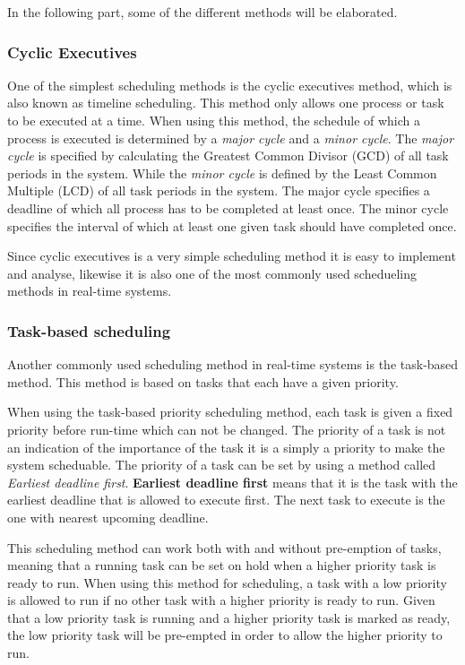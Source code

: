 In the following part, some of the different methods will be elaborated. 

\subsubsection{Cyclic Executives}
One of the simplest scheduling methods is the cyclic executives method, which is also known as timeline scheduling.
This method only allows one process or task to be executed at a time. 
When using this method, the schedule of which a process is executed is determined by a \textit{major cycle} and a \textit{minor cycle}.
The \textit{major cycle} is specified by calculating the Greatest Common Divisor (GCD) of all task periods in the system.
While the \textit{minor cycle} is defined by the Least Common Multiple (LCD) of all task periods in the system. 
The major cycle specifies a deadline of which all process has to be completed at least once.
The minor cycle specifies the interval of which at least one given task should have completed once. 

Since cyclic executives is a very simple scheduling method it is easy to implement and analyse, likewise it is also one of the most commonly used schedueling methods in real-time systems\cite{RealTimeEmbeddedSystems}. 

\subsubsection{Task-based scheduling}
Another commonly used scheduling method in real-time systems is the task-based method. 
This method is based on tasks that each have a given priority.

When using the task-based priority scheduling method, each task is given a fixed priority before run-time which can not be changed.
The priority of a task is not an indication of the importance of the task it is a simply a priority to make the system scheduable\cite{RealTimeEmbeddedSystems}. 
The priority of a task can be set by using a method called \textit{Earliest deadline first}.
\textbf{Earliest deadline first} means that it is the task with the earliest deadline that is allowed to execute first.
The next task to execute is the one with nearest upcoming deadline.

This scheduling method can work both with and without pre-emption of tasks, meaning that a running task can be set on hold when a higher priority task is ready to run.
When using this method for scheduling, a task with a low priority is allowed to run if no other task with a higher priority is ready to run. 
Given that a low priority task is running and a higher priority task is marked as ready, the low priority task will be pre-empted in order to allow the higher priority to run.

